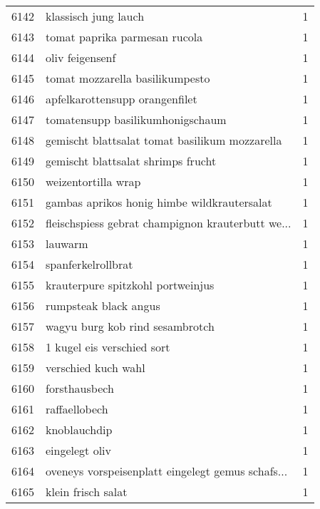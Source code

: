 \begin{tabular}{llr}
6142 &                               klassisch jung lauch &      1 \\
6143 &                      tomat paprika parmesan rucola &      1 \\
6144 &                                    oliv feigensenf &      1 \\
6145 &                    tomat mozzarella basilikumpesto &      1 \\
6146 &                     apfelkarottensupp orangenfilet &      1 \\
6147 &                   tomatensupp basilikumhonigschaum &      1 \\
6148 &     gemischt blattsalat tomat basilikum mozzarella &      1 \\
6149 &                 gemischt blattsalat shrimps frucht &      1 \\
6150 &                                weizentortilla wrap &      1 \\
6151 &        gambas aprikos honig himbe wildkrautersalat &      1 \\
6152 &  fleischspiess gebrat champignon krauterbutt we... &      1 \\
6153 &                                            lauwarm &      1 \\
6154 &                                 spanferkelrollbrat &      1 \\
6155 &                  krauterpure spitzkohl portweinjus &      1 \\
6156 &                              rumpsteak black angus &      1 \\
6157 &                    wagyu burg kob rind sesambrotch &      1 \\
6158 &                         1 kugel eis verschied sort &      1 \\
6159 &                                verschied kuch wahl &      1 \\
6160 &                                      forsthausbech &      1 \\
6161 &                                      raffaellobech &      1 \\
6162 &                                       knoblauchdip &      1 \\
6163 &                                     eingelegt oliv &      1 \\
6164 &  oveneys vorspeisenplatt eingelegt gemus schafs... &      1 \\
6165 &                                 klein frisch salat &      1 \\

\end{tabular}
